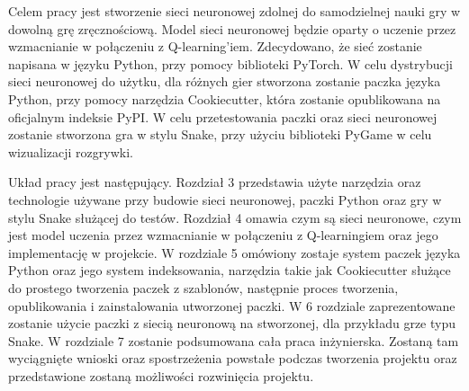 Celem pracy jest stworzenie sieci neuronowej zdolnej do samodzielnej nauki gry w dowolną grę zręcznościową. Model sieci neuronowej będzie oparty o uczenie przez wzmacnianie w połączeniu z Q-learning'iem. Zdecydowano, że sieć zostanie napisana w języku Python, przy pomocy biblioteki PyTorch. W celu dystrybucji sieci neuronowej do użytku, dla różnych gier stworzona zostanie paczka języka Python, przy pomocy narzędzia Cookiecutter, która zostanie opublikowana na oficjalnym indeksie PyPI. W celu przetestowania paczki oraz sieci neuronowej zostanie stworzona gra w stylu Snake, przy użyciu biblioteki PyGame w celu wizualizacji rozgrywki.
\newline

Układ pracy jest następujący. Rozdział 3 przedstawia użyte narzędzia oraz technologie używane przy budowie sieci neuronowej, paczki Python oraz gry w stylu Snake służącej do testów. Rozdział 4 omawia czym są sieci neuronowe, czym jest model uczenia przez wzmacnianie w połączeniu z Q-learningiem oraz jego implementację w projekcie. W rozdziale 5 omówiony zostaje system paczek języka Python oraz jego system indeksowania, narzędzia takie jak Cookiecutter służące do prostego tworzenia paczek z szablonów, następnie proces tworzenia, opublikowania i zainstalowania utworzonej paczki. W 6 rozdziale zaprezentowane zostanie użycie paczki z siecią neuronową na stworzonej, dla przykładu grze typu Snake. W rozdziale 7 zostanie podsumowana cała praca inżynierska. Zostaną tam wyciągnięte wnioski oraz spostrzeżenia powstałe podczas tworzenia projektu oraz przedstawione zostaną możliwości rozwinięcia projektu.


